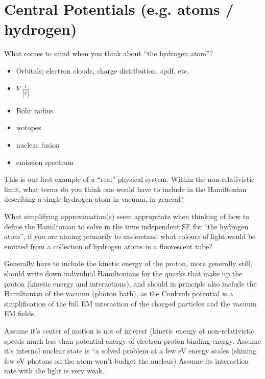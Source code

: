 \documentclass{article}
\begin{document}
\section{Central Potentials (e.g. atoms / hydrogen)}

What comes to mind when you think about “the hydrogen atom”?

\begin{itemize}
    \item Orbitals; electron clouds, charge distribution, spdf, etc.
    \item $V ~ \frac{1}{|\vec{r}|}$
    \item Bohr radius
    \item isotopes
    \item nuclear fusion
    \item emission spectrum
\end{itemize}

This is our first example of a “real” physical system.  Within the non-relativistic limit, what terms do you think one would have to include in the Hamiltonian describing a single hydrogen atom in vacuum, in general?

What simplifying approximation(s) seem appropriate when thinking of how to define the Hamiltonian to solve in the time independent SE for “the hydrogen atom”, if you are aiming primarily to understand what colours of light would be emitted from a collection of hydrogen atoms in a fluorescent tube?

Generally have to include the kinetic energy of the proton, more generally still, should write down individual Hamiltonians for the quarks that make up the proton (kinetic energy  and interactions), and should in principle also include the Hamiltonian of the vacuum (photon bath), as the Coulomb potential is a simplification of the full EM interaction of the charged particles and the vacuum EM fields.

Assume it’s center of motion is not of interest (kinetic energy at non-relativistic speeds much less than potential energy of electron-proton binding energy.
Assume it’s internal nuclear state is “a solved problem at a few eV energy scales (shining few eV photons on the atom won’t budget the nucleus)
Assume its interaction rate with the light is very weak.
\end{document}
